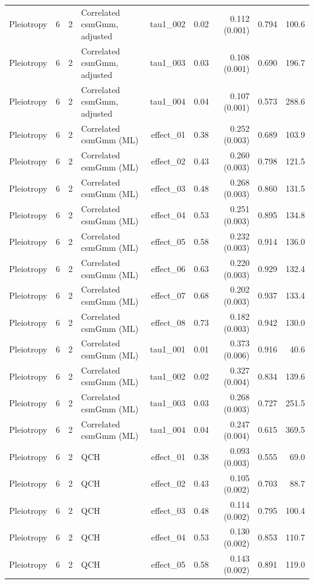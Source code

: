\begin{longtable}{lcclrrrrr}
Pleiotropy & 6 & 2 & Correlated csmGmm, adjusted & tau1\_002 & 0.02 & 0.112 (0.001) & 0.794 & 100.6\\
Pleiotropy & 6 & 2 & Correlated csmGmm, adjusted & tau1\_003 & 0.03 & 0.108 (0.001) & 0.690 & 196.7\\
Pleiotropy & 6 & 2 & Correlated csmGmm, adjusted & tau1\_004 & 0.04 & 0.107 (0.001) & 0.573 & 288.6\\
Pleiotropy & 6 & 2 & Correlated csmGmm (ML) & effect\_01 & 0.38 & 0.252 (0.003) & 0.689 & 103.9\\
Pleiotropy & 6 & 2 & Correlated csmGmm (ML) & effect\_02 & 0.43 & 0.260 (0.003) & 0.798 & 121.5\\
Pleiotropy & 6 & 2 & Correlated csmGmm (ML) & effect\_03 & 0.48 & 0.268 (0.003) & 0.860 & 131.5\\
Pleiotropy & 6 & 2 & Correlated csmGmm (ML) & effect\_04 & 0.53 & 0.251 (0.003) & 0.895 & 134.8\\
Pleiotropy & 6 & 2 & Correlated csmGmm (ML) & effect\_05 & 0.58 & 0.232 (0.003) & 0.914 & 136.0\\
Pleiotropy & 6 & 2 & Correlated csmGmm (ML) & effect\_06 & 0.63 & 0.220 (0.003) & 0.929 & 132.4\\
Pleiotropy & 6 & 2 & Correlated csmGmm (ML) & effect\_07 & 0.68 & 0.202 (0.003) & 0.937 & 133.4\\
Pleiotropy & 6 & 2 & Correlated csmGmm (ML) & effect\_08 & 0.73 & 0.182 (0.003) & 0.942 & 130.0\\
Pleiotropy & 6 & 2 & Correlated csmGmm (ML) & tau1\_001 & 0.01 & 0.373 (0.006) & 0.916 & 40.6\\
Pleiotropy & 6 & 2 & Correlated csmGmm (ML) & tau1\_002 & 0.02 & 0.327 (0.004) & 0.834 & 139.6\\
Pleiotropy & 6 & 2 & Correlated csmGmm (ML) & tau1\_003 & 0.03 & 0.268 (0.003) & 0.727 & 251.5\\
Pleiotropy & 6 & 2 & Correlated csmGmm (ML) & tau1\_004 & 0.04 & 0.247 (0.004) & 0.615 & 369.5\\
Pleiotropy & 6 & 2 & QCH & effect\_01 & 0.38 & 0.093 (0.003) & 0.555 & 69.0\\
Pleiotropy & 6 & 2 & QCH & effect\_02 & 0.43 & 0.105 (0.002) & 0.703 & 88.7\\
Pleiotropy & 6 & 2 & QCH & effect\_03 & 0.48 & 0.114 (0.002) & 0.795 & 100.4\\
Pleiotropy & 6 & 2 & QCH & effect\_04 & 0.53 & 0.130 (0.002) & 0.853 & 110.7\\
Pleiotropy & 6 & 2 & QCH & effect\_05 & 0.58 & 0.143 (0.002) & 0.891 & 119.0\\

\end{longtable}
